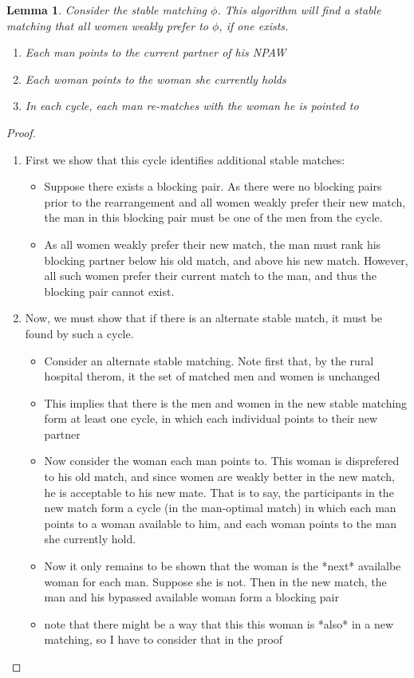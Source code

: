 \documentclass[WP]{AEA}
\newtheorem{lemma}{Lemma}
\begin{document}
\begin{lemma}
	Consider the stable matching $\phi$. This algorithm will find a stable matching that all women weakly prefer to $\phi$, if one exists.
	\begin{enumerate}
		\item Each man points to the current partner of his NPAW
		\item Each woman points to the woman she currently holds
		\item In each cycle, each man re-matches with the woman he is pointed to
	\end{enumerate}
\end{lemma}
\begin{proof}
	\begin{enumerate}
		\item 	First we show that this cycle identifies additional stable matches:
		\begin{itemize}
			\item Suppose there exists a blocking pair. As there were no blocking pairs prior to the rearrangement and all women weakly prefer their new match, the man in this blocking pair must be one of the men from the cycle.
			\item As all women weakly prefer their new match, the man must rank his blocking partner below his old match, and above his new match. However, all such women prefer their current match to the man, and thus the blocking pair cannot exist. 
		\end{itemize}	
		\item Now, we must show that if there is an alternate stable match, it must be found by such a cycle. 
		\begin{itemize}
			\item Consider an alternate stable matching. Note first that, by the rural hospital therom, it the set of matched men and women is unchanged
			\item This implies that there is the men and women in the new stable matching form at least one cycle, in which each individual points to their new partner
			\item Now consider the woman each man points to. This woman is disprefered to his old match, and since women are weakly better in the new match, he is acceptable to his new mate. That is to say, the participants in the new match form a cycle (in the man-optimal match) in which each man points to a woman available to him, and each woman points to the man she currently hold.
			\item Now it only remains to be shown that the woman is the *next* availalbe woman for each man. Suppose she is not. Then in the new match, the man and his bypassed available woman form a blocking pair
			\item note that there might be a way that this this woman is *also* in a new matching, so I have to consider that in the proof
		\end{itemize}
	\end{enumerate}
\end{proof}
\end{document}
